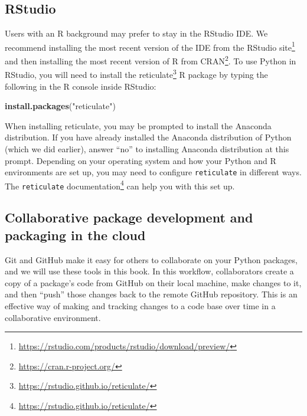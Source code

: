 \documentclass[
]{krantz}
\makeatletter
\newenvironment{Shaded}{\begin{snugshade}}{\end{snugshade}}
\newcommand{\KeywordTok}[1]{\textcolor[rgb]{0.27,0.27,0.27}{\textbf{#1}}}
\newcommand{\NormalTok}[1]{#1}
\newcommand{\StringTok}[1]{\textcolor[rgb]{0.5,0.5,0.5}{#1}}
\renewcommand{\href}[2]{#2\footnote{\url{#1}}}
\newenvironment{kframe}{%
\medskip{}
\setlength{\fboxsep}{.8em}
 \def\at@end@of@kframe{}%
 \ifinner\ifhmode%
  \def\at@end@of@kframe{\end{minipage}}%
  \begin{minipage}{\columnwidth}%
 \fi\fi%
 \def\FrameCommand##1{\hskip\@totalleftmargin \hskip-\fboxsep
 \colorbox{shadecolor}{##1}\hskip-\fboxsep
     \hskip-\linewidth \hskip-\@totalleftmargin \hskip\columnwidth}%
 \MakeFramed {\advance\hsize-\width
   \@totalleftmargin\z@ \linewidth\hsize
   \@setminipage}}%
 {\par\unskip\endMakeFramed%
 \at@end@of@kframe}
\renewenvironment{Shaded}{\begin{kframe}}{\end{kframe}}
\makeatother
\begin{document}
\hypertarget{rstudio}{%
\subsection{RStudio}\label{rstudio}}

Users with an R background may prefer to stay in the RStudio IDE. We recommend installing the most recent version of the IDE from the \href{https://rstudio.com/products/rstudio/download/preview/}{RStudio site} and then installing the most recent version of R from \href{https://cran.r-project.org/}{CRAN}. To use Python in RStudio, you will need to install the \href{https://rstudio.github.io/reticulate/}{reticulate} R package by typing the following in the R console inside RStudio:

\begin{Shaded}
\begin{Highlighting}[]
\KeywordTok{install.packages}\NormalTok{(}\StringTok{"reticulate"}\NormalTok{)}
\end{Highlighting}
\end{Shaded}

When installing reticulate, you may be prompted to install the Anaconda distribution. If you have already installed the Anaconda distribution of Python (which we did earlier), answer ``no'' to installing Anaconda distribution at this prompt. Depending on your operating system and how your Python and R environments are set up, you may need to configure \texttt{reticulate} in different ways. The \texttt{reticulate} \href{https://rstudio.github.io/reticulate/}{documentation} can help you with this set up.

\hypertarget{collaborative-package-development-and-packaging-in-the-cloud}{%
\subsection{Collaborative package development and packaging in the cloud}\label{collaborative-package-development-and-packaging-in-the-cloud}}

Git and GitHub make it easy for others to collaborate on your Python packages, and we will use these tools in this book. In this workflow, collaborators create a copy of a package's code from GitHub on their local machine, make changes to it, and then ``push'' those changes back to the remote GitHub repository. This is an effective way of making and tracking changes to a code base over time in a collaborative environment.
\end{document}
